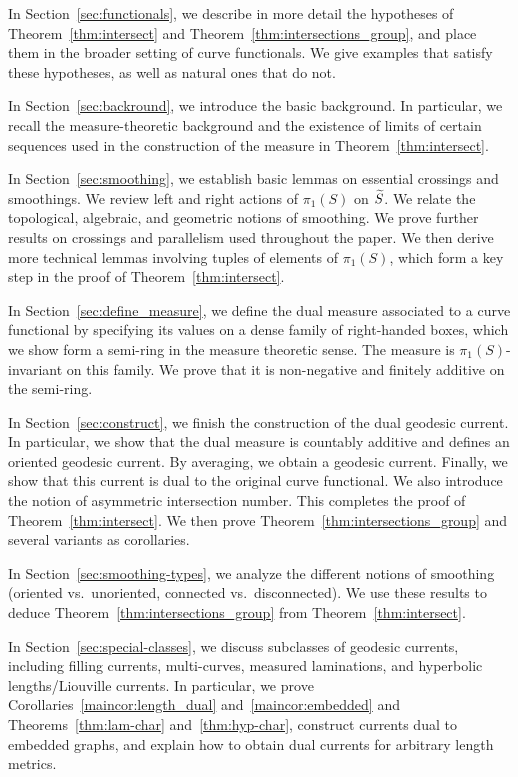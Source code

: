 In Section~\ref{sec:functionals}, we describe in more detail the
hypotheses of Theorem~\ref{thm:intersect} and
Theorem~\ref{thm:intersections_group}, and place them in the broader
setting of curve functionals. We give examples that satisfy these
hypotheses, as well as natural ones that do not.

In Section~\ref{sec:backround}, we introduce the basic background. In particular, we recall the measure-theoretic background and the existence of limits of certain sequences used in the construction of the measure in Theorem~\ref{thm:intersect}. 

In Section~\ref{sec:smoothing}, we establish basic lemmas on essential
crossings and smoothings. We review left and right actions of
$\pi_1(S)$ on $\widetilde{S}$. We relate the topological, algebraic, and
geometric notions of smoothing. We prove further results on crossings
and parallelism used throughout the paper. We then derive more
technical lemmas involving tuples of elements of $\pi_1(S)$, which
form a key step in the proof of Theorem~\ref{thm:intersect}.

In Section~\ref{sec:define_measure}, we define the dual measure associated to a curve functional by specifying its values on a dense family of right-handed boxes, which we show form a semi-ring in the measure theoretic sense. The measure is $\pi_1(S)$-invariant on this family. We prove that it is non-negative and finitely additive on the semi-ring.

In Section~\ref{sec:construct}, we finish the construction of the dual
geodesic current. In particular, we show that the dual measure is
countably additive and defines an oriented geodesic current. By
averaging, we obtain a geodesic current. Finally, we show that this
current is dual to the original curve functional. We also introduce
the notion of asymmetric intersection number. This completes the proof
of Theorem~\ref{thm:intersect}.
We then prove Theorem~\ref{thm:intersections_group} and several variants as corollaries.

In Section~\ref{sec:smoothing-types}, we analyze the different notions
of smoothing (oriented vs.\ unoriented, connected vs.\ disconnected). We use
these results to deduce Theorem~\ref{thm:intersections_group} from
Theorem~\ref{thm:intersect}.

In Section~\ref{sec:special-classes}, we discuss subclasses of
geodesic currents, including filling currents, multi-curves, measured
laminations, and hyperbolic lengths/Liouville currents. In particular,
we prove
Corollaries~\ref{maincor:length_dual} and~\ref{maincor:embedded} and
Theorems~\ref{thm:lam-char} and~\ref{thm:hyp-char},
construct currents dual to
embedded graphs, and explain how to obtain dual currents for arbitrary
length metrics.




